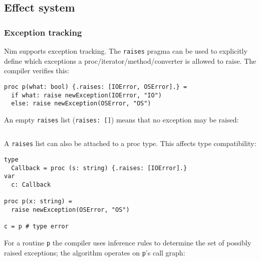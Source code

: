 \hypertarget{effect-system}{%
\subsection{Effect system}\label{effect-system}}

\hypertarget{exception-tracking}{%
\subsubsection{Exception tracking}\label{exception-tracking}}

Nim supports exception tracking. The \texttt{raises} pragma can be used
to explicitly define which exceptions a proc/iterator/method/converter
is allowed to raise. The compiler verifies this:

\begin{verbatim}
proc p(what: bool) {.raises: [IOError, OSError].} =
  if what: raise newException(IOError, "IO")
  else: raise newException(OSError, "OS")
\end{verbatim}

An empty \texttt{raises} list (\texttt{raises:\ {[}{]}}) means that no
exception may be raised:

\begin{verbatim}
\end{verbatim}

A \texttt{raises} list can also be attached to a proc type. This affects
type compatibility:

\begin{verbatim}
type
  Callback = proc (s: string) {.raises: [IOError].}
var
  c: Callback

proc p(x: string) =
  raise newException(OSError, "OS")

c = p # type error
\end{verbatim}

For a routine \texttt{p} the compiler uses inference rules to determine
the set of possibly raised exceptions; the algorithm operates on
\texttt{p}'s call graph:

